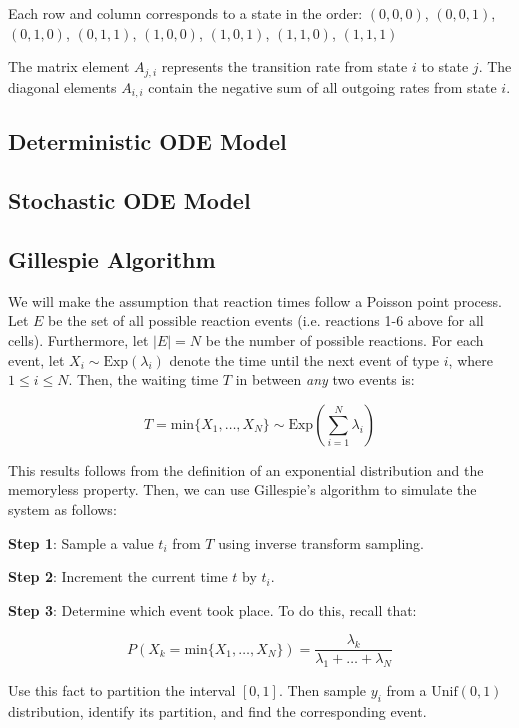 \documentclass{article}
\begin{document}
\begin{flushleft}
Each row and column corresponds to a state in the order:
$(0,0,0)$, $(0,0,1)$, $(0,1,0)$, $(0,1,1)$, $(1,0,0)$, $(1,0,1)$, $(1,1,0)$, $(1,1,1)$

The matrix element $A_{j,i}$ represents the transition rate from state $i$ to state $j$. The diagonal elements $A_{i,i}$ contain the negative sum of all outgoing rates from state $i$.

\subsection{Deterministic ODE Model}

\subsection{Stochastic ODE Model}

\subsection{Gillespie Algorithm}

We will make the assumption that reaction times follow a Poisson point process. Let $E$ be the set of all possible reaction events (i.e. reactions 1-6 above for all cells). Furthermore, let $|E| = N$ be the number of possible reactions. For each event, let $X_{i} \sim \text{Exp}(\lambda_{i})$ denote the time until the next event of type $i$, where $1 \leq i \leq N$. Then, the waiting time $T$ in between \emph{any} two events is:

$$
T = \text{min} \{ X_{1}, \dots, X_{N} \} \sim \text{Exp}\left( \sum_{i = 1}^{N} \lambda_{i} \right) 
$$

This results follows from the definition of an exponential distribution and the memoryless property. Then, we can use Gillespie's algorithm to simulate the system as follows:

\medskip

\textbf{Step 1}: Sample a value $t_{i}$ from $T$ using inverse transform sampling. 

\medskip

\textbf{Step 2}: Increment the current time $t$ by $t_{i}$.

\medskip

\textbf{Step 3}: Determine which event took place. To do this, recall that:

$$P(X_{k} = \text{min} \{  X_{1}, \dots, X_{N} \}) = \frac{\lambda_{k}}{\lambda_{1} + \dots + \lambda_{N}}$$

Use this fact to partition the interval $[0, 1]$. Then sample $y_{i}$ from a $\text{Unif}(0, 1)$ distribution, identify its partition, and find the corresponding event.


\end{flushleft}
\end{document}
